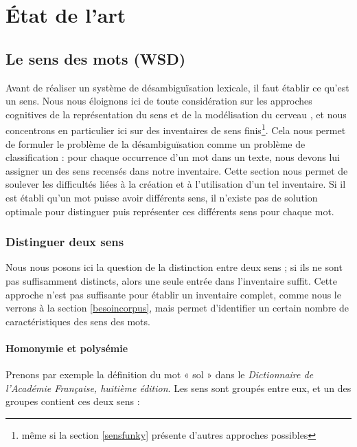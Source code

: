 \chapter{État de l'art} 
\label{ch:etatdelart} 

\section{Le sens des mots (WSD)} %

Avant de réaliser un système de désambiguïsation lexicale, il faut établir ce
qu'est un sens. Nous nous éloignons ici de toute considération sur les
approches cognitives de la représentation du sens et de la modélisation du
cerveau \citep{harnad1990symbol}, et nous concentrons en particulier ici sur
des inventaires de sens finis\footnote{même si la section \ref{sensfunky}
présente d'autres approches possibles}. Cela nous permet de formuler le
problème de la désambiguïsation comme un problème de classification : pour
chaque occurrence d'un mot dans un texte, nous devons lui assigner un des sens
recensés dans notre inventaire. Cette section nous permet de soulever les
difficultés liées à la création et à l'utilisation d'un tel inventaire. Si il
est établi qu'un mot puisse avoir différents sens, il n'existe pas de solution
optimale pour distinguer puis représenter ces différents sens pour chaque mot.

\subsection{Distinguer deux sens}

Nous nous posons ici la question de la distinction entre deux sens ; si ils ne
sont pas suffisamment distincts, alors une seule entrée dans l'inventaire
suffit. Cette approche n'est pas suffisante pour établir un inventaire complet,
comme nous le verrons à la section \ref{besoincorpus}, mais permet d'identifier
un certain nombre de caractéristiques des sens des mots.

\subsubsection{Homonymie et polysémie}

Prenons par exemple la définition du mot « sol » dans le \textit{Dictionnaire
de l'Académie Française, huitième édition}. Les sens sont groupés entre eux, et
un des groupes contient ces deux sens :

